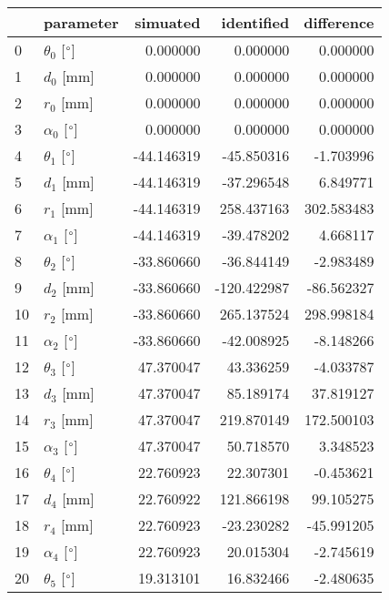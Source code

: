 \documentclass{standalone}%
\begin{document}
%
\normalsize%
\begin{tabular}{llrrr}
\toprule
{} &                 parameter &   simuated &  identified &  difference \\
\midrule
0  &  $\theta_{0}$ [$\degree$] &   0.000000 &    0.000000 &    0.000000 \\
1  &              $d_{0}$ [mm] &   0.000000 &    0.000000 &    0.000000 \\
2  &              $r_{0}$ [mm] &   0.000000 &    0.000000 &    0.000000 \\
3  &  $\alpha_{0}$ [$\degree$] &   0.000000 &    0.000000 &    0.000000 \\
4  &  $\theta_{1}$ [$\degree$] & -44.146319 &  -45.850316 &   -1.703996 \\
5  &              $d_{1}$ [mm] & -44.146319 &  -37.296548 &    6.849771 \\
6  &              $r_{1}$ [mm] & -44.146319 &  258.437163 &  302.583483 \\
7  &  $\alpha_{1}$ [$\degree$] & -44.146319 &  -39.478202 &    4.668117 \\
8  &  $\theta_{2}$ [$\degree$] & -33.860660 &  -36.844149 &   -2.983489 \\
9  &              $d_{2}$ [mm] & -33.860660 & -120.422987 &  -86.562327 \\
10 &              $r_{2}$ [mm] & -33.860660 &  265.137524 &  298.998184 \\
11 &  $\alpha_{2}$ [$\degree$] & -33.860660 &  -42.008925 &   -8.148266 \\
12 &  $\theta_{3}$ [$\degree$] &  47.370047 &   43.336259 &   -4.033787 \\
13 &              $d_{3}$ [mm] &  47.370047 &   85.189174 &   37.819127 \\
14 &              $r_{3}$ [mm] &  47.370047 &  219.870149 &  172.500103 \\
15 &  $\alpha_{3}$ [$\degree$] &  47.370047 &   50.718570 &    3.348523 \\
16 &  $\theta_{4}$ [$\degree$] &  22.760923 &   22.307301 &   -0.453621 \\
17 &              $d_{4}$ [mm] &  22.760922 &  121.866198 &   99.105275 \\
18 &              $r_{4}$ [mm] &  22.760923 &  -23.230282 &  -45.991205 \\
19 &  $\alpha_{4}$ [$\degree$] &  22.760923 &   20.015304 &   -2.745619 \\
20 &  $\theta_{5}$ [$\degree$] &  19.313101 &   16.832466 &   -2.480635 \\

\end{tabular}
\end{document}
